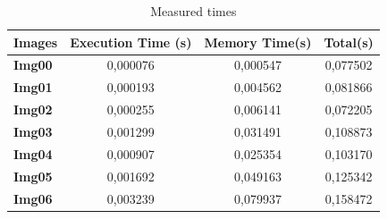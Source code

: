 \documentclass[a4paper]{article}
\begin{document}
\begin{table}[!ht]
\centering
\begin{tabular}{|l|c|c|c|}
\hline
\textbf{Images} & \textbf{Execution Time (s)} & \textbf{Memory Time(s)} & \textbf{Total(s)} \\ \hline
\textbf{Img00}  & 0,000076                    & 0,000547                & 0,077502          \\ \hline
\textbf{Img01}  & 0,000193                    & 0,004562                & 0,081866          \\ \hline
\textbf{Img02}  & 0,000255                    & 0,006141                & 0,072205          \\ \hline
\textbf{Img03}  & 0,001299                    & 0,031491                & 0,108873          \\ \hline
\textbf{Img04}  & 0,000907                    & 0,025354                & 0,103170          \\ \hline
\textbf{Img05}  & 0,001692                    & 0,049163                & 0,125342          \\ \hline
\textbf{Img06}  & 0,003239                    & 0,079937                & 0,158472          \\ \hline
\end{tabular}
\caption{Measured times}
\label{dmt}
\end{table}
\FloatBarrier
\end{document}

